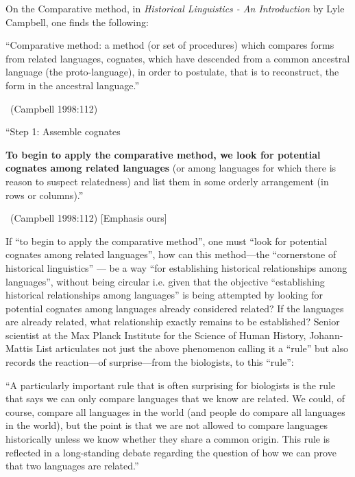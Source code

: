 On the Comparative method, in \textit{Historical Linguistics - An Introduction} by Lyle Campbell, one finds the following:

\begin{myquote}
“Comparative method: a method (or set of procedures) which compares forms from related languages, cognates, which have descended from a common ancestral language (the proto-language), in order to postulate, that is to reconstruct, the form in the ancestral language.” 

~\hfill (Campbell 1998:112)
\end{myquote}

\begin{myquote}
“Step 1: Assemble cognates
\end{myquote}

\begin{myquote}
\textbf{To begin to apply the comparative method, we look for potential cognates among related languages} (or among languages for which there is reason to suspect relatedness) and list them in some orderly arrangement (in rows or columns).” 

~\hfill (Campbell 1998:112) [Emphasis ours]
\end{myquote}

If “to begin to apply the comparative method”, one must “look for potential cognates among related languages”, how can this method—the “cornerstone of historical linguistics” — be a way “for establishing historical relationships among languages”, without being circular i.e. given that the objective “establishing historical relationships among languages” is being attempted by looking for potential cognates among languages already considered related? If the languages are already related, what relationship exactly remains to be established? Senior scientist at the Max Planck Institute for the Science of Human History, Johann-Mattis List articulates not just the above phenomenon calling it a “rule” but also records the reaction—of surprise—from the biologists, to this “rule”:

\begin{myquote}
“A particularly important rule that is often surprising for biologists is the rule that says we can only compare languages that we know are related. We could, of course, compare all languages in the world (and people do compare all languages in the world), but the point is that we are not allowed to compare languages historically unless we know whether they share a common origin. This rule is reflected in a long-standing debate regarding the question of how we can prove that two languages are related.”
\end{myquote}

